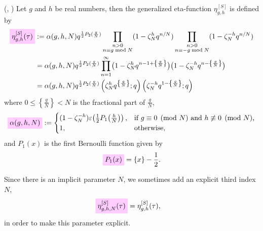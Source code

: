\documentclass{article}
\begin{document}
\begin{Definition}
  (\cite{Schoeneberg:EllipticModularFunctions:1974},
  \cite[p.~672]{Yang:GeneralizedDedekindEtaFunctions:2004})
  Let $g$ and $h$ be
  real numbers, then the generalized eta-function $\eta_{g,h}^{[S]}$
  is defined by
\begin{align}
  \defineNotation[eta-g-h-tau-Schoeneberg]{\eta_{g,h}^{[S]}(\tau)}
  &:=
  \alpha(g,h,N) q^{\frac{1}{2} P_2(\frac{g}{N})}
  \prod_{\substack{n>0\\n\equiv g \bmod N}}
       (1-\zeta_N^h q^{n/N})
  \prod_{\substack{n>0\\n\equiv -g \bmod N}}
       (1-\zeta_N^{-h} q^{n/N})
  \notag\\
  &=
  \alpha(g,h,N) q^{\frac{1}{2} P_2(\frac{g}{N})}
  \prod_{n=1}^\infty
    \bigl(1-\zeta_N^h q^{n-1 + \left\{\frac{g}{N}\right\}}\bigr)
    \bigl(1-\zeta_N^{-h} q^{n - \left\{\frac{g}{N}\right\}}\bigr)
  \notag\\
  &=
  \alpha(g,h,N) q^{\frac{1}{2} P_2(\frac{g}{N})}
  \left( \zeta_N^h q^{\left\{\frac{g}{N}\right\}}; q \right)
  \left( \zeta_N^{-h} q^{1-\left\{\frac{g}{N}\right\}}; q \right)
  \label{eq:eta_g-h^[S](tau)}
\end{align}
where $0\le\left\{\frac{g}{N}\right\}<N$ is the fractional part of
$\frac{g}{N}$,
\begin{gather}
  \defineNotation[alpha-g-h-N]{\alpha(g,h,N)}
  :=
  \begin{cases}
    (1 - \zeta_N^{-h}) \unityPower{\frac{1}{2} P_1\!\left(\frac{h}{N}\right)},
    &
    \text{if $g\equiv0\pmod{N}$ and $h\not\equiv0\pmod{N}$,}
    \\
    1, & \text{otherwise},
  \end{cases}
  \label{eq:eta_g-h^[S](tau)-prefactor}
\end{gather}
and $P_1(x)$ is the first Bernoulli function given by
\begin{gather*}
  \defineNotation[P-1]{P_1(x)}
  =
  \{x\} - \frac{1}{2}.
\end{gather*}

Since there is an implicit parameter $N$, we sometimes add an explicit
third index $N$, \ie
\begin{align}
  \label{eq:eta_g-h-N^[S](tau)}
  \defineNotation[eta-g-h-N-tau-Schoeneberg]{\eta_{g,h,N}^{[S]}(\tau)}
  &=
  \eta_{g,h}^{[S]}(\tau),
\end{align}
in order to make this parameter explicit.
\end{Definition}
\end{document}
